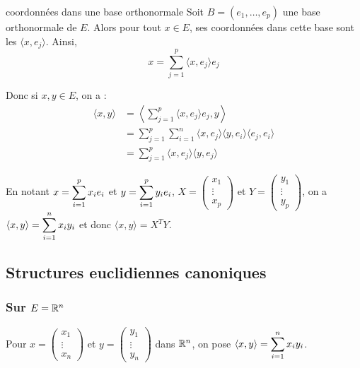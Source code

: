 \begin{proposition}{coordonnées dans une base orthonormale}{}
    Soit $B = (e_1, \dots, e_p)$ une base orthonormale de $E$. Alors pour tout 
    $x \in E$, ses coordonnées dans cette base sont les $\langle x, e_j \rangle$. 
    Ainsi, 
    $$x = \sum_{j = 1}^p \langle x, e_j \rangle e_j$$    
\end{proposition}

Donc si $x, y \in E$, on a : 
\begin{align}
    \langle x, y \rangle & = \left\langle \sum_{j = 1}^p \langle x, e_j \rangle e_j, y \right\rangle \\
    & = \sum_{j = 1}^p \sum_{i = 1}^{n } \langle x, e_j \rangle \langle y, e_i \rangle \langle e_j, e_i \rangle \\
    & = \sum_{j = 1}^p \langle x, e_j \rangle \langle y, e_j \rangle
\end{align}

En notant $\displaystyle x = \sum_{i = 1}^{p } x_i e_i$ et $\displaystyle y = \sum_{i = 1}^{p } y_i e_i$, 
$X = \begin{pmatrix}
x_1 \\ \vdots \\ x_p
\end{pmatrix}$ et $Y = \begin{pmatrix}y_1 \\ \vdots \\ y_p
\end{pmatrix}$, on a $\langle x, y \rangle = \displaystyle \sum_{i = 1}^{n } x_i y_i$ et donc $\langle x, y \rangle = X^T Y$.


\subsection{Structures euclidiennes canoniques }
\subsubsection{Sur \texorpdfstring{$E = \mathbb{R}^n$}{E = Rn}}

Pour $x = \begin{pmatrix}
x_1 \\ \vdots \\ x_n
\end{pmatrix}$ et $y = \begin{pmatrix}y_1 \\ \vdots \\ y_n
\end{pmatrix}$ dans $\mathbb{R}^n$, on pose $\langle x, y \rangle = \displaystyle \sum_{i=1}^{n} x_i y_i$.

